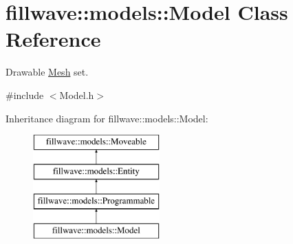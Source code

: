 \hypertarget{classfillwave_1_1models_1_1Model}{}\section{fillwave\+:\+:models\+:\+:Model Class Reference}
\label{classfillwave_1_1models_1_1Model}


Drawable \hyperlink{classfillwave_1_1models_1_1Mesh}{Mesh} set.  




{\ttfamily \#include $<$Model.\+h$>$}

Inheritance diagram for fillwave\+:\+:models\+:\+:Model\+:\begin{figure}[H]
\begin{center}
\leavevmode
\includegraphics[height=4.000000cm]{classfillwave_1_1models_1_1Model}
\end{center}
\end{figure}
